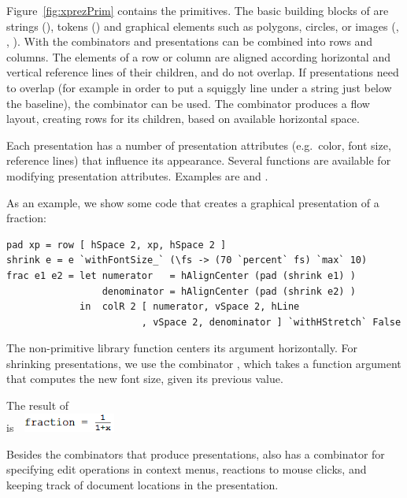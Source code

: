 \documentclass[12pt]{article}
\begin{document}
Figure~\ref{fig:xprezPrim} contains the \Xprez primitives. The basic building blocks of \Xprez are strings (), tokens () and graphical elements such as polygons, circles, or images (, , ). With the combinators  and  presentations can be combined into rows and columns. The elements of a row or column are aligned according horizontal and vertical reference lines of their children, and do not overlap. If presentations need to overlap (for example in order to put a squiggly line under a string just below the baseline), the  combinator can be used. The  combinator produces a flow layout, creating rows for its children, based on available horizontal space.

Each presentation has a number of presentation attributes (e.g.\ color, font size, reference lines) that influence its appearance. Several functions are available for modifying presentation attributes. Examples are  and . 


As an example, we show some \Xprez code that creates a graphical presentation of a fraction:

\begin{footnotesize}
\begin{verbatim}
pad xp = row [ hSpace 2, xp, hSpace 2 ]
shrink e = e `withFontSize_` (\fs -> (70 `percent` fs) `max` 10)
frac e1 e2 = let numerator   = hAlignCenter (pad (shrink e1) )
                 denominator = hAlignCenter (pad (shrink e2) )
             in  colR 2 [ numerator, vSpace 2, hLine
                        , vSpace 2, denominator ] `withHStretch` False
\end{verbatim}
\end{footnotesize}

The non-primitive library function  centers its argument horizontally. For shrinking presentations, we use the combinator , which takes a function argument that computes the new font size, given its previous value.

The result of \\ 
is~~\includegraphics[width=3cm]{images/fracExample}

Besides the combinators that produce presentations, \Xprez also has a combinator for specifying edit operations in context menus, reactions to mouse clicks, and keeping track of document locations in the presentation. 
\end{document}
